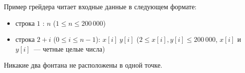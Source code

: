 Пример грейдера читает входные данные в следующем формате:
\begin{itemize}
\item строка $1$ : $n$ ($1 \leq n \leq 200\,000$)
\item строка $2+i$ ($0 \leq i \leq n - 1$): $x[i]\ y[i]$ ($2 \leq x[i], y[i] \leq 200\,000$, $x[i]$ и $y[i]$~--- четные целые числа)
\end{itemize}

Никакие два фонтана не расположены в одной точке.
